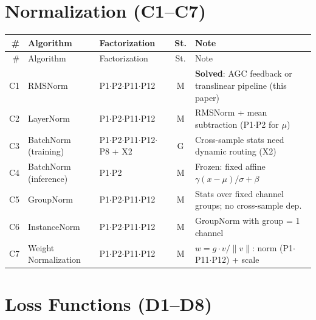 \documentclass[10pt]{article}
\begin{document}
\section{Normalization (C1--C7)}

\begin{longtable}{rlp{3.0cm}cp{4.8cm}}
\toprule
\# & Algorithm & Factorization & St. & Note \\
\midrule
\endfirsthead
\toprule
\# & Algorithm & Factorization & St. & Note \\
\midrule
\endhead
\bottomrule
\endfoot
C1 & RMSNorm & P1$\cdot$P2$\cdot$P11$\cdot$P12 & M & \textbf{Solved}: AGC feedback or translinear pipeline (this paper) \\
C2 & LayerNorm & P1$\cdot$P2$\cdot$P11$\cdot$P12 & M & RMSNorm + mean subtraction (P1$\cdot$P2 for $\mu$) \\
C3 & BatchNorm (training) & P1$\cdot$P2$\cdot$P11$\cdot$P12$\cdot$P8 + X2 & G & Cross-sample stats need dynamic routing (X2) \\
C4 & BatchNorm (inference) & P1$\cdot$P2 & M & Frozen: fixed affine $\gamma(x-\mu)/\sigma + \beta$ \\
C5 & GroupNorm & P1$\cdot$P2$\cdot$P11$\cdot$P12 & M & Stats over fixed channel groups; no cross-sample dep. \\
C6 & InstanceNorm & P1$\cdot$P2$\cdot$P11$\cdot$P12 & M & GroupNorm with group = 1 channel \\
C7 & Weight Normalization & P1$\cdot$P2$\cdot$P11$\cdot$P12 & M & $w = g \cdot v / \|v\|$: norm (P1$\cdot$P11$\cdot$P12) + scale \\
\end{longtable}

\section{Loss Functions (D1--D8)}
\end{document}
